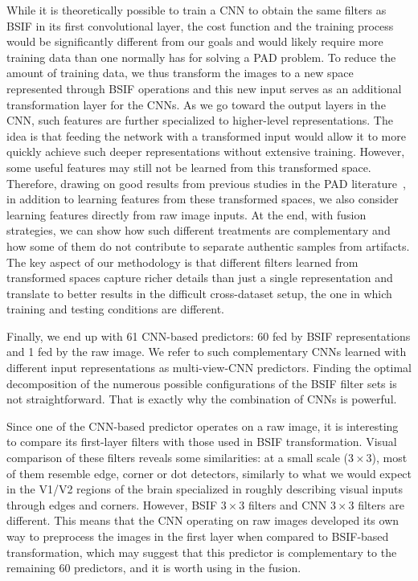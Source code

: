 While it is theoretically possible to train a CNN to obtain the same filters as BSIF in its first convolutional layer, the cost function and the training process would be significantly different from our goals and would likely require more training data than one normally has for solving a PAD problem. To reduce the amount of training data, we thus transform the images to a new space represented through BSIF operations and this new input serves as an additional transformation layer for the CNNs. As we go toward the output layers in the CNN, such features are further specialized to higher-level representations. The idea is that feeding the network with a transformed input would allow it to more quickly achieve such deeper representations without extensive training. However, some useful features may still not be learned from this transformed space. Therefore, drawing on good results from previous studies in the PAD literature~\cite{Menotti:TIFS:2015, livdet2017}, in addition to learning features from these transformed spaces, we also consider learning features directly from raw image inputs. At the end, with fusion strategies, we can show how such different treatments are complementary and how some of them do not contribute to separate authentic samples from artifacts. The key aspect of our methodology is that different filters learned from transformed spaces capture richer details than just a single representation and translate to better results in the difficult cross-dataset setup, the one in which training and testing conditions are different. 

Finally, we end up with 61 CNN-based predictors: 60 fed by BSIF representations and 1 fed by the raw image. We refer to such complementary CNNs learned with different input representations as multi-view-CNN predictors. Finding the optimal decomposition of the numerous possible configurations of the BSIF filter sets is not straightforward. That is exactly why the combination of CNNs is powerful. 

Since one of the CNN-based predictor operates on a raw image, it is interesting to compare its first-layer filters with those used in BSIF transformation. Visual comparison of these filters reveals some similarities: at a small scale ($3 \times 3$), most of them resemble edge, corner or dot detectors, similarly to what we would expect in the V1/V2 regions of the brain specialized in roughly describing visual inputs through edges and corners. However, BSIF $3 \times 3$ filters and CNN $3 \times 3$ filters are different. This means that the CNN operating on raw images developed its own way to preprocess the images in the first layer when compared to BSIF-based transformation, which may suggest that this predictor is complementary to the remaining 60 predictors, and it is worth using in the fusion.

